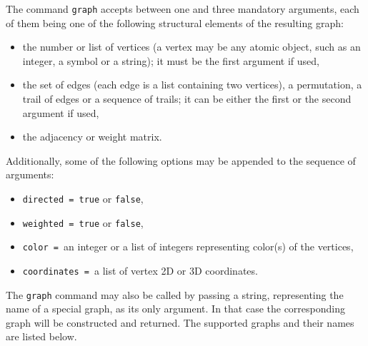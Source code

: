 \documentclass[a4paper,11pt]{article}
\begin{document}
The command {\tt graph} accepts between one and three mandatory arguments, each of them being one of the following structural elements of the resulting graph:
\begin{itemize}
  \item the number or list of vertices (a vertex may be any atomic object, such as an integer, a symbol or a string); it must be the first argument if used,
  \item the set of edges (each edge is a list containing two vertices), a permutation, a trail of edges or a sequence of trails; it can be either the first or the second argument if used,
  \item the adjacency or weight matrix.
\end{itemize}
Additionally, some of the following options may be appended to the sequence of arguments:
\begin{itemize}
  \item {\tt directed = true} or {\tt false},
  \item {\tt weighted = true} or {\tt false},
  \item {\tt color = }an integer or a list of integers representing color(s) of the vertices,
  \item {\tt coordinates = }a list of vertex 2D or 3D coordinates.
\end{itemize}
The {\tt graph} command may also be called by passing a string, representing the name of a special graph, as its only argument. In that case the corresponding graph will be constructed and returned. The supported graphs and their names are listed below.
\end{document}
